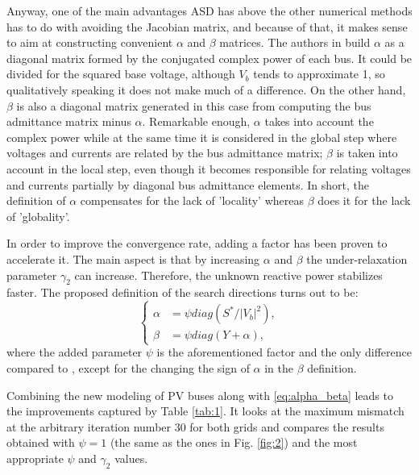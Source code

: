 \documentclass[journal]{IEEEtran}
\begin{document}
Anyway, one of the main advantages ASD has above the other numerical methods has to do with avoiding the Jacobian matrix, and because of that, it makes sense to aim at constructing convenient $\alpha$ and $\beta$ matrices. The authors in \cite{asd} build $\alpha$ as a diagonal matrix formed by the conjugated complex power of each bus. It could be divided for the squared base voltage, although $V_b$ tends to approximate 1, so qualitatively speaking it does not make much of a difference. On the other hand, $\beta$ is also a diagonal matrix generated in this case from computing the bus admittance matrix minus $\alpha$. Remarkable enough, $\alpha$ takes into account the complex power while at the same time it is considered in the global step where voltages and currents are related by the bus admittance matrix; $\beta$ is taken into account in the local step, even though it becomes responsible for relating voltages and currents partially by diagonal bus admittance elements. In short, the definition of $\alpha$ compensates for the lack of 'locality' whereas $\beta$ does it for the lack of 'globality'.

In order to improve the convergence rate, adding a factor has been proven to accelerate it. The main aspect is that by increasing $\alpha$ and $\beta$ the under-relaxation parameter $\gamma_2$ can increase. Therefore, the unknown reactive power stabilizes faster. The proposed definition of the search directions turns out to be:
\begin{equation}
  \begin{cases}
    \alpha &= \psi diag(S^* / |V_b|^2),\\
    \beta &= \psi diag(Y+\alpha),
  \end{cases}
  \label{eq:alpha_beta}
\end{equation}
where the added parameter $\psi$ is the aforementioned factor and the only difference compared to \cite{asd}, except for the changing the sign of $\alpha$ in the $\beta$ definition.

Combining the new modeling of PV buses along with \eqref{eq:alpha_beta} leads to the improvements captured by Table \ref{tab:1}. It looks at the maximum mismatch at the arbitrary iteration number 30 for both grids and compares the results obtained with $\psi=1$ (the same as the ones in Fig. \ref{fig:2}) and the most appropriate $\psi$ and $\gamma_2$ values.
\end{document}
